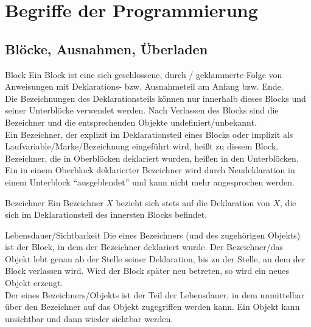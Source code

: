\chapter{%
    Begriffe der Programmierung%
}

\section{%
    Blöcke, Ausnahmen, Überladen%
}

\begin{Def}{Block}
    Ein Block ist eine sich geschlossene, durch /
    geklammerte Folge von Anweisungen mit Deklarations- bzw. Ausnahmeteil
    am Anfang bzw. Ende. \\
    Die Bezeichnungen des Deklarationsteils können nur innerhalb dieses
    Blocks und seiner Unterblöcke verwendet werden.
    Nach Verlassen des Blocks sind die Bezeichner und die entsprechenden
    Objekte undefiniert/unbekannt. \\
    Ein Bezeichner, der explizit im Deklarationsteil eines Blocks oder implizit
    als Laufvariable/Marke/Bezeichnung eingeführt wird, heißt 
    zu diesem Block.
    Bezeichner, die in Oberblöcken deklariert wurden, heißen 
    in den Unterblöcken. \\
    Ein in einem Oberblock deklarierter Bezeichner wird durch Neudeklaration
    in einem Unterblock "`ausgeblendet"' und kann nicht mehr angesprochen
    werden.
\end{Def}

\begin{Def}{Bezeichner}
    Ein Bezeichner $X$ bezieht sich stets auf die Deklaration von $X$,
    die sich im Deklarationsteil des innersten Blocks befindet.
\end{Def}

\begin{Def}{Lebensdauer/Sichtbarkeit}
    Die  eines Bezeichners (und des zugehörigen Objekts)
    ist der Block, in dem der Bezeichner deklariert wurde.
    Der Bezeichner/das Objekt lebt genau ab der Stelle seiner Deklaration,
    bis zu der Stelle, an dem der Block verlassen wird.
    Wird der Block später neu betreten, so wird ein neues Objekt erzeugt. \\
    Der  eines Bezeichners/Objekts
    ist der Teil der Lebensdauer, in dem unmittelbar über den Bezeichner
    auf das Objekt zugegriffen werden kann.
    Ein Objekt kann unsichtbar und dann wieder sichtbar werden.
\end{Def}

